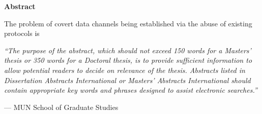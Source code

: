 \begin{center}
\textbf{\large Abstract}
\end{center}

The problem of covert data channels being established via the abuse of existing protocols is 


\vspace{1cm}

\emph{``The purpose of the abstract, which should not exceed 150 words for
a Masters' thesis or 350 words for a Doctoral thesis, is to provide
sufficient information to allow potential readers to decide on relevance
of the thesis. Abstracts listed in Dissertation Abstracts International
or Masters' Abstracts International should contain appropriate key
words and phrases designed to assist electronic searches.''}

\hfill --- MUN School of Graduate Studies
